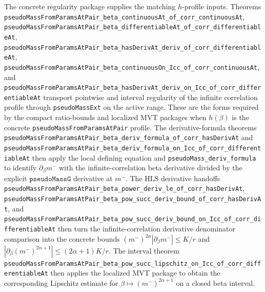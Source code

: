 \documentclass[a4paper,11pt]{article}
\begin{document}
The concrete regularity package supplies the matching \(h\)-profile inputs.
Theorems
\texttt{pseudoMassFromParamsAtPair\_beta\_continuousAt\_of\_corr\_continuousAt},
\texttt{pseudoMassFromParamsAtPair\_beta\_differentiableAt\_of\_corr\_differentiableAt},
\texttt{pseudoMassFromParamsAtPair\_beta\_hasDerivAt\_deriv\_of\_corr\_differentiableAt},
\texttt{pseudoMassFromParamsAtPair\_beta\_continuousOn\_Icc\_of\_corr\_continuousAt},
and
\texttt{pseudoMassFromParamsAtPair\_beta\_hasDerivAt\_deriv\_on\_Icc\_of\_corr\_differentiableAt}
transport pointwise and interval regularity of the infinite correlation
profile through \texttt{pseudoMassExt} on the active range.  These are the
forms required by the compact ratio-bounds and localized MVT packages when
\(h(\beta)\) is the concrete \texttt{pseudoMassFromParamsAtPair} profile.
The derivative-formula theorems
\texttt{pseudoMassFromParamsAtPair\_beta\_deriv\_formula\_of\_corr\_hasDerivAt}
and
\texttt{pseudoMassFromParamsAtPair\_beta\_deriv\_formula\_on\_Icc\_of\_corr\_differentiableAt}
then apply the local defining equation and
\texttt{pseudoMass\_deriv\_formula} to identify \(\partial_\beta m^-\) with
the infinite-correlation beta derivative divided by the explicit
\(\texttt{pseudoMassG}\) derivative at \(m^-\).
The HLS derivative handoffs
\texttt{pseudoMassFromParamsAtPair\_beta\_power\_deriv\_le\_of\_corr\_hasDerivAt},
\texttt{pseudoMassFromParamsAtPair\_beta\_pow\_succ\_deriv\_bound\_of\_corr\_hasDerivAt},
and
\texttt{pseudoMassFromParamsAtPair\_beta\_pow\_succ\_deriv\_bound\_on\_Icc\_of\_corr\_differentiableAt}
then turn the infinite-correlation derivative denominator comparison into the
concrete bounds
\((m^-)^{2\alpha}|\partial_\beta m^-|\le K/r\) and
\(|\partial_\beta (m^-)^{2\alpha+1}|\le (2\alpha+1)K/r\).
The interval theorem
\texttt{pseudoMassFromParamsAtPair\_beta\_pow\_succ\_lipschitz\_on\_Icc\_of\_corr\_differentiableAt}
then applies the localized MVT package to obtain the corresponding Lipschitz
estimate for \(\beta\mapsto (m^-)^{2\alpha+1}\) on a closed beta interval.
\end{document}
